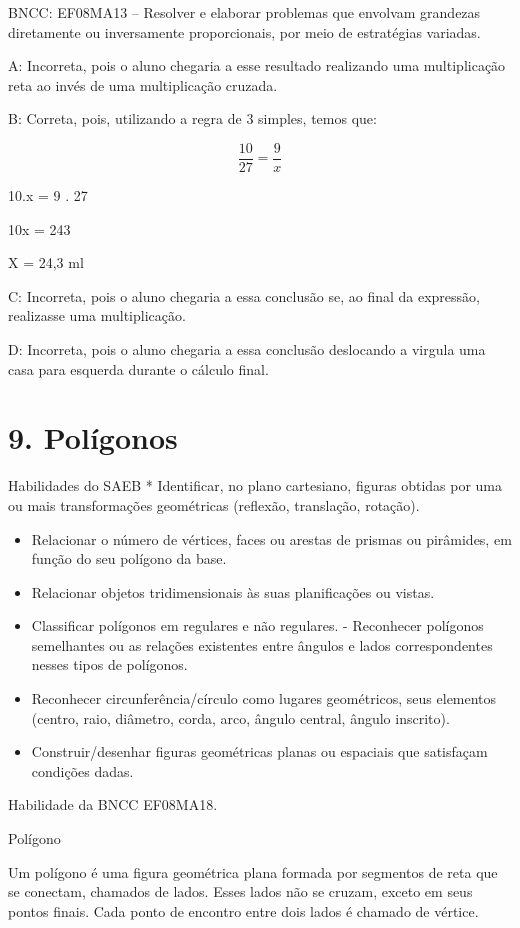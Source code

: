 BNCC: EF08MA13 -- Resolver e elaborar problemas que envolvam grandezas
diretamente ou inversamente proporcionais, por meio de estratégias
variadas.

A: Incorreta, pois o aluno chegaria a esse resultado realizando uma
multiplicação reta ao invés de uma multiplicação cruzada.

B: Correta, pois, utilizando a regra de 3 simples, temos que:

\[\frac {10}{27} = \frac{9}{x}\]

10.x = 9 . 27

10x = 243

X = 24,3 ml

C: Incorreta, pois o aluno chegaria a essa conclusão se, ao final da
expressão, realizasse uma multiplicação.

D: Incorreta, pois o aluno chegaria a essa conclusão deslocando a
virgula uma casa para esquerda durante o cálculo final.


\section{9. Polígonos}

Habilidades do SAEB * Identificar, no plano cartesiano, figuras obtidas
por uma ou mais transformações geométricas (reflexão, translação,
rotação).

\begin{itemize}
\item
  Relacionar o número de vértices, faces ou arestas de prismas ou
  pirâmides, em função do seu polígono da base.
\item
  Relacionar objetos tridimensionais às suas planificações ou vistas.
\item
  Classificar polígonos em regulares e não regulares. - Reconhecer
  polígonos semelhantes ou as relações existentes entre ângulos e lados
  correspondentes nesses tipos de polígonos.
\item
  Reconhecer circunferência/círculo como lugares geométricos, seus
  elementos (centro, raio, diâmetro, corda, arco, ângulo central, ângulo
  inscrito).
\item
  Construir/desenhar figuras geométricas planas ou espaciais que
  satisfaçam condições dadas.
\end{itemize}

Habilidade da BNCC EF08MA18.

Polígono

Um polígono é uma figura geométrica plana formada por segmentos de reta
que se conectam, chamados de lados. Esses lados não se cruzam, exceto em
seus pontos finais. Cada ponto de encontro entre dois lados é chamado de
vértice.

